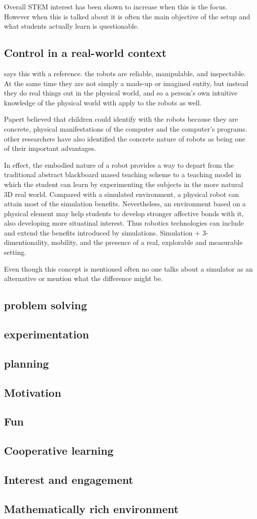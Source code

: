 Overall STEM interest has been shown to increase when this is the focus. However when this is talked about it is often the main objective of the setup and what students actually learn is questionable.

\subsection{Control in a real-world context}

\cite{silk2011resources} says this with a reference. the robots are reliable, manipulable, and inspectable. At the same time they are not simply a made-up or imagined entity, but instead they do real things out in the physical world, and so a person's own intuitive knowledge of the physical world with apply to the robots as well. 

\cite{barker2007robotics} Papert believed that children could identify with the robots because they are concrete, physical manifestations of the computer and the computer's programs. other researchers have also identified the concrete nature of robots as being one of their important advantages. 

\cite{mitnik2009collaborative} In effect, the embodied nature of a robot provides a way to depart from the traditional abstract blackboard mased teaching scheme to a teaching model in which the student can learn by experimenting the subjects in the more natural 3D real world. Compared with a simulated environment, a physical robot can attain most of the simulation benefits. Nevertheless, an environment based on a physical element may help students to develop stronger affective bonds with it, also developing more situatinal interest. Thus robotics technologies can include and extend the benefits introduced by simulations. Simulation + 3-dimentionality, mobility, and the presence of a real, explorable and measurable setting. 

Even though this concept is mentioned often no one talks about a simulator as an alternative or mention what the difference might be. 

\subsection{problem solving}
\subsection{experimentation}
\subsection{planning}
\subsection{Motivation}
\subsection{Fun}
\subsection{Cooperative learning}
\subsection{Interest and engagement}
\subsection{Mathematically rich environment}
